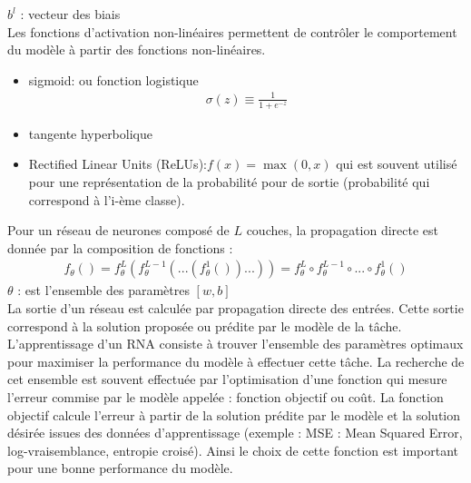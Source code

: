 $b^l$ : vecteur des biais\\
\smallskip
Les fonctions d'activation non-linéaires permettent de contrôler le comportement du modèle à partir des fonctions non-linéaires.\\
\begin{itemize}
	\item sigmoid: ou fonction logistique\\
	\begin{eqnarray} \sigma(z) \equiv \frac{1}{1+e^{-z}}\end{eqnarray} 
	\item tangente hyperbolique
	\item Rectified Linear Units (ReLUs):$ f(x)=\max(0,x)$
	qui est souvent utilisé pour une représentation de la probabilité pour de sortie (probabilité qui correspond à l'i-ème classe).
\end{itemize}

\qquad Pour un réseau de neurones composé de $L$ couches, la propagation directe est donnée par la composition de fonctions :
\begin{eqnarray}
f_\theta()= f_\theta^L(f_\theta^{L-1}( ... (f_\theta^1()) ... )) = f_\theta^L \circ  f_\theta^{L-1} \circ ... \circ f_\theta^1()
\end{eqnarray}
$\theta$ :  est l'ensemble des paramètres $[w,b]$
\\
\qquad La sortie d'un réseau est calculée par propagation directe des entrées. Cette sortie correspond à la solution proposée ou prédite par le modèle de la tâche. L'apprentissage d'un RNA consiste à trouver l'ensemble des paramètres optimaux pour maximiser la performance du modèle à effectuer cette tâche. La recherche de cet ensemble est souvent effectuée par l'optimisation d'une fonction qui mesure l'erreur commise par le modèle appelée : fonction objectif ou coût. La fonction objectif calcule l'erreur  à partir de la solution prédite par le modèle et la solution désirée issues des données d’apprentissage (exemple : MSE : Mean Squared Error, log-vraisemblance, entropie croisé). Ainsi le choix de cette fonction est important pour une bonne performance du modèle.\\

